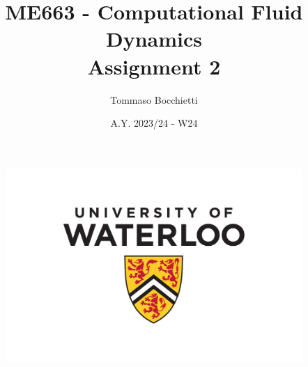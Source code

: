 \documentclass{assignment}
\begin{document}
\title{ME663 - Computational Fluid Dynamics \\ Assignment 2}
\author{Tommaso Bocchietti}
\date{A.Y. 2023/24 - W24}

\maketitle

\begin{figure}[H]
    \centering
    \includegraphics[width=.9\textwidth]{./pdf/UniversityOfWaterloo_logo_vert_pms}
    \label{fig:University_Of_Waterloo_logo}
\end{figure}

\clearpage
\tableofcontents
\listoffigures
\listoftables
\lstlistoflistings
\printglossary[type=\acronymtype]

\clearpage



% 
% 
% 
% 
% 

\clearpage






% 
\end{document}
